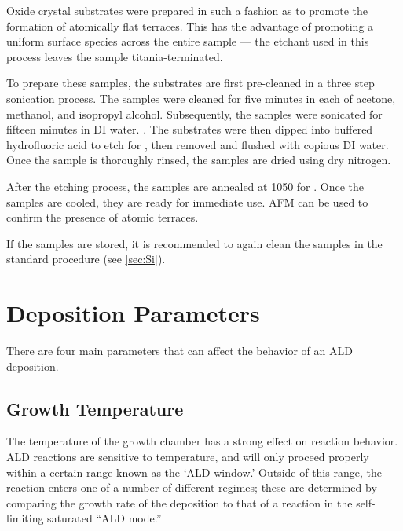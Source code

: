 Oxide crystal substrates were prepared in such a fashion as to promote the formation of atomically flat terraces. This has the advantage of promoting a uniform surface species across the entire sample --- the etchant used in this process leaves the sample titania-terminated. 

To prepare these samples, the substrates are first pre-cleaned in a three step sonication process. The samples were cleaned for five minutes in each of acetone, methanol, and isopropyl alcohol. Subsequently, the samples were sonicated for fifteen minutes in DI water. . The substrates were then dipped into buffered hydrofluoric acid to etch for , then removed and flushed with copious DI water.  Once the sample is thoroughly rinsed, the samples are dried using dry nitrogen. 

After the etching process, the samples are annealed at 1050\degC{} for . Once the samples are cooled, they are ready for immediate use. AFM can be used to confirm the presence of atomic terraces. 

If the samples are stored, it is recommended to again clean the samples in the standard procedure (see \vref{sec:Si}).


\section{Deposition Parameters}
\label{sec:SampFab-DepParams}

There are four main parameters that can affect the behavior of an ALD deposition. 


\subsection{Growth Temperature}

The temperature of the growth chamber has a strong effect on reaction behavior. ALD reactions are sensitive to temperature, and will only proceed properly within a certain range known as the `ALD window.' Outside of this range, the reaction enters one of a number of different regimes; these are determined by comparing the growth rate of the deposition to that of a reaction in the self-limiting saturated ``ALD mode.'' 

